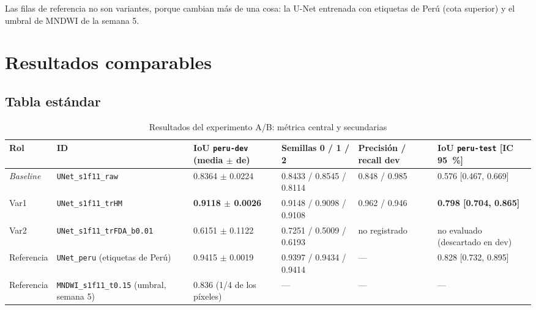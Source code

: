 Las filas de referencia no son variantes, porque cambian más de una cosa: la U-Net entrenada con
etiquetas de Perú (cota superior) y el umbral de MNDWI de la semana 5.

\section{Resultados comparables}

\subsection{Tabla estándar}

\begin{table}[H]
    \centering
    \small
    \caption{Resultados del experimento A/B: métrica central y secundarias}
    \label{tab:sprint_ab_metricas}
    \begin{tabular}{|p{1.5cm}|p{3.3cm}|p{2.4cm}|p{2.6cm}|p{1.8cm}|p{2.4cm}|}
        \hline
        \textbf{Rol} & \textbf{ID} & \textbf{IoU \texttt{peru-\allowbreak{}dev} (media $\pm$ de)} & \textbf{Semillas 0 / 1 / 2} & \textbf{Precisión / recall dev} & \textbf{IoU \texttt{peru-\allowbreak{}test} [IC 95~\%]} \\
        \hline
        \textit{Baseline} & \texttt{UNet\_\allowbreak{}s1f11\_\allowbreak{}raw} & 0.8364 $\pm$ 0.0224 & 0.8433 / 0.8545 / 0.8114 & 0.848 / 0.985 & 0.576 [0.467, 0.669] \\
        \hline
        Var1 & \texttt{UNet\_\allowbreak{}s1f11\_\allowbreak{}trHM} & \textbf{0.9118 $\pm$ 0.0026} & 0.9148 / 0.9098 / 0.9108 & 0.962 / 0.946 & \textbf{0.798 [0.704, 0.865]} \\
        \hline
        Var2 & \texttt{UNet\_\allowbreak{}s1f11\_\allowbreak{}trFDA\_\allowbreak{}b0.01} & 0.6151 $\pm$ 0.1122 & 0.7251 / 0.5009 / 0.6193 & no registrado & no evaluado (descartado en dev) \\
        \hline
        Referencia & \texttt{UNet\_\allowbreak{}peru} (etiquetas de Perú) & 0.9415 $\pm$ 0.0019 & 0.9397 / 0.9434 / 0.9414 & --- & 0.828 [0.732, 0.895] \\
        \hline
        Referencia & \texttt{MNDWI\_\allowbreak{}s1f11\_\allowbreak{}t0.15} (umbral, semana 5) & 0.836 (1/4 de los píxeles) & --- & --- & --- \\
        \hline
    \end{tabular}
\end{table}

